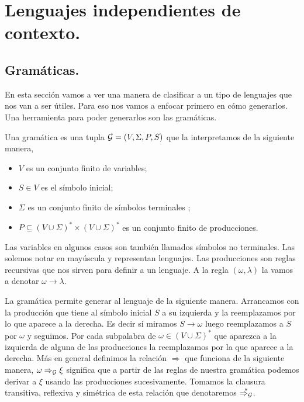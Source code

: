 \documentclass[tesis.tex]{subfiles}
\begin{document}
\section{Lenguajes independientes de contexto.}
\subsection{Gramáticas.}
En esta sección vamos a ver una manera de clasificar a un tipo de lenguajes que nos van a ser útiles. Para eso nos vamos a enfocar primero en cómo generarlos. Una herramienta para poder generarlos son las gramáticas.

\begin{deff}
	Una gramática es una tupla ${\cal G} = (V, \Sigma, P, S)$ que la interpretamos de la siguiente manera,
\begin{itemize}
		\item $V$ es un conjunto finito de variables;
		\item $S \in V$ es el símbolo inicial;
		\item $\Sigma$ es un conjunto finito de símbolos terminales ;
		\item $P \subseteq (V \cup \Sigma)^* \times (V \cup \Sigma)^*$ es un conjunto finito de producciones.
\end{itemize}
\end{deff}

Las variables en algunos casos son también llamados símbolos no terminales. Las solemos notar en mayúscula y representan lenguajes. Las producciones son reglas recursivas que nos sirven para definir a un lenguaje. A la regla $(\omega, \lambda)$ la vamos a denotar $\omega \to \lambda$.

La gramática permite generar al lenguaje de la siguiente manera. Arrancamos con la producción que tiene al símbolo inicial $S$ a su izquierda y la reemplazamos por lo que aparece a la derecha. Es decir si miramos $S \to \omega$ luego reemplazamos a $S$ por $\omega$ y seguimos. Por cada subpalabra de $\omega\in (V \cup \Sigma)^*$ que aparezca a la izquierda de alguna de las producciones la reemplazamos por la que aparece a la derecha. Más en general definimos la relación $\Rightarrow$ que funciona de la siguiente manera, $\omega \Rightarrow_{\cal G} \xi$ significa que a partir de las reglas de nuestra gramática podemos derivar a $\xi$ usando las producciones sucesivamente. Tomamos la clausura transitiva, reflexiva y simétrica de esta relación que denotaremos $\overset{*}{\Rightarrow_{\cal G}}$.
\end{document}
